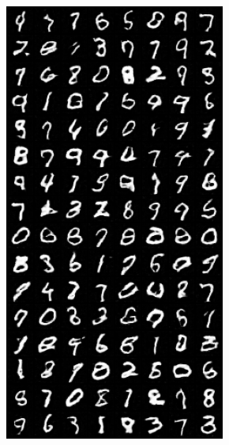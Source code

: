 \begin{figure}[H]
    \begin{subfigure}{0.2\textwidth}
        \centering
        \includegraphics[width=0.95\linewidth]{nz/nz50_fake_sample_epoch_0010.png}
        \caption{}
        \label{subfig:nz50}
    \end{subfigure}%
    \begin{subfigure}{0.2\textwidth}
        \centering

\end{subfigure}
\end{figure}
